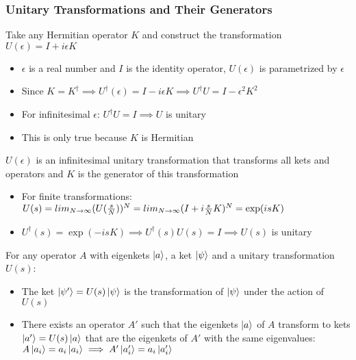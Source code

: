 \documentclass[8pt,t,mathserif,aspectratio=169]{beamer}
\begin{document}
\begin{frame}
  \frametitle{Unitary Transformations and Their Generators}
  \vspace{1mm}
  Take any Hermitian operator $K$ and construct the transformation $U(\epsilon) = I + i \epsilon K$
  \begin{itemize}
    \item $\epsilon$ is a real number and $I$ is the identity operator, $U(\epsilon)$ is parametrized by $\epsilon$
    \item Since $K = K^{\dagger} \implies U^{\dagger}(\epsilon) = I - i \epsilon K \implies U^{\dagger} U = I - \epsilon^2 K^2$
    \item For infinitesimal $\epsilon$: $U^{\dagger} U = I \implies U$ is unitary
    \item This is only true because $K$ is Hermitian
  \end{itemize}
  $U(\epsilon)$ is an infinitesimal unitary transformation that transforms all kets and operators and $K$ is the generator of this transformation
  \begin{itemize}
    \item For finite transformations: $U(s) = lim_{N \to \infty} (U({s \over N}))^{N} = lim_{N \to \infty} (I + i {s \over N} K)^{N} = \exp(i s K)$
    \item $U^{\dagger}(s) = \exp(-isK) \implies U^{\dagger}(s) U(s) = I \implies U(s)$ is unitary
  \end{itemize}
  For any operator $A$ with eigenkets $\ket{a}$, a ket $\ket{\psi}$ and a unitary transformation $U(s)$:
  \begin{itemize}
    \item The ket $\ket{\psi'} = U(s) \ket{\psi}$ is the transformation of $\ket{\psi}$ under the action of $U(s)$
    \item There exists an operator $A'$ such that the eigenkets $\ket{a}$ of $A$ transform to kets $\ket{a'} = U(s) \ket{a}$ that are the eigenkets of $A'$ with the same eigenvalues: $A \ket{a_i} = a_i \ket{a_i} \implies A' \ket{a_i'} = a_i \ket{a_i'}$
  \end{itemize}
\end{frame}
\end{document}
